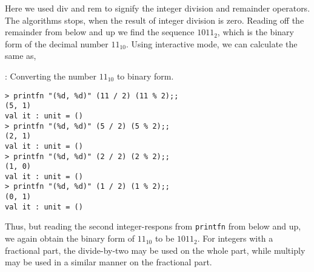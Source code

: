 Here we used div and rem to signify the integer division and remainder operators. The algorithms stops, when the result of integer division is zero. Reading off the remainder from below and up we find the sequence $1011_2$, which is the binary form of the decimal number $11_{10}$. Using interactive mode, we can calculate the same as,
\begin{codeNOutput}{: Converting the number $11_{10}$ to binary form.}
\begin{lstlisting}[language=console]
> printfn "(%d, %d)" (11 / 2) (11 % 2);;
(5, 1)
val it : unit = ()
> printfn "(%d, %d)" (5 / 2) (5 % 2);;  
(2, 1)
val it : unit = ()
> printfn "(%d, %d)" (2 / 2) (2 % 2);;  
(1, 0)
val it : unit = ()
> printfn "(%d, %d)" (1 / 2) (1 % 2);;
(0, 1)
val it : unit = ()
\end{lstlisting}
\end{codeNOutput}
Thus, but reading the second integer-respons from \lstinline!printfn! from below and up, we again obtain the binary form of $11_{10}$ to be $1011_2$. For integers with a fractional part, the divide-by-two may be used on the whole part, while multiply may be used in a similar manner on the fractional part.


